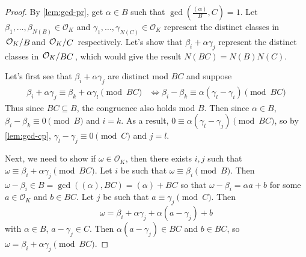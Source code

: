 \documentclass[11pt, a4paper]{memoir}
\theoremstyle{change}
\theoremstyle{plain}
\theoremstyle{nonumberplain}
\newtheorem{proof}{Proof}
\newcommand{\quot}[2]{\mathchoice{\left.\raisebox{0.13em}{$#1$}\middle/\raisebox{-0.13em}{$#2$}\right.}
                                 {\left.\raisebox{0.07em}{$#1$}\middle/\raisebox{-0.07em}{$#2$}\right.}
                                 {\left.\raisebox{0.03em}{$#1$}\middle/\raisebox{-0.03em}{$#2$}\right.}
                                 {\left.\raisebox{0em}{$#1$}\middle/\raisebox{0em}{$#2$}\right.}}
\numberwithin{equation}{section}
\begin{document}
\begin{proof}
    By \cref{lem:gcd-pr}, get $\alpha\in B$ such that $\gcd\left(\frac{(\alpha)}{B},C\right)=1$.
    Let $\beta_1,\ldots,\beta_{N(B)}\in\mathcal{O}_K$ and $\gamma_1,\ldots,\gamma_{N(C)}\in\mathcal{O}_K$ represent the distinct classes in $\quot{\mathcal{O}_K}{B}$and $\quot{\mathcal{O}_K}{C}$ respectively.
    Let's show that $\beta_i+\alpha\gamma_j$ represent the distinct classes in $\quot{\mathcal{O}_K}{BC}$, which would give the result $N(BC)=N(B)N(C)$.

    Let's first see that $\beta_i+\alpha\gamma_j$ are distinct mod $BC$ and suppose
    \begin{align*}
        \beta_i+\alpha\gamma_j \equiv\beta_k+\alpha\gamma_l\pmod{BC}&\iff \beta_i-\beta_k \equiv\alpha(\gamma_l-\gamma_i)\pmod{BC}
    \end{align*}
    Thus since $BC\subseteq B$, the congruence also holds mod $B$.
    Then since $\alpha\in B$, $\beta_i-\beta_k\equiv 0\pmod{B}$ and $i=k$.
    As a result, $0\equiv\alpha(\gamma_l-\gamma_j)\pmod{BC}$, so by \cref{lem:gcd-cp}, $\gamma_l-\gamma_j\equiv 0\pmod{C}$ and $j=l$.

    Next, we need to show if $\omega\in\mathcal{O}_K$, then there exists $i,j$ such that $\omega\equiv\beta_i+\alpha\gamma_j\pmod{BC}$.
    Let $i$ be such that $\omega\equiv\beta_i\pmod{B}$.
    Then $\omega-\beta_i\in B=\gcd((\alpha),BC)=(\alpha)+BC$ so that $\omega-\beta_i=\alpha a+b$ for some $a\in\mathcal{O}_K$ and $b\in BC$.
    Let $j$ be such that $a\equiv\gamma_j\pmod{C}$.
    Then
    \begin{equation*}
        \omega=\beta_i+\alpha\gamma_j+\alpha(a-\gamma_j)+b
    \end{equation*}
    with $\alpha\in B$, $a-\gamma_j\in C$.
    Then $\alpha(a-\gamma_j)\in BC$ and $b\in BC$, so $\omega=\beta_i+\alpha\gamma_j\pmod{BC}$.
\end{proof}
\end{document}
